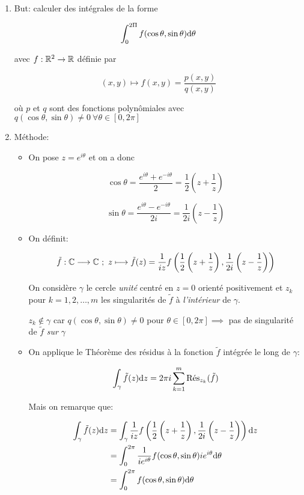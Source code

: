 \begin{enumerate}[label=\alph*)]
    \item But: calculer des intégrales de la forme
    
    \[ \int_0^{2\Pi} f(\cos \theta, \sin \theta) \dth \]
    
    avec $f: \R^2 \rightarrow \R$ définie par
    
    \[ (x,y) \longmapsto f(x,y) = \frac{p(x,y)}{q(x,y)} \]
    
    où $p$ et $q$ sont des fonctions polynômiales avec $q(\cos \theta, \sin \theta) \neq 0 \ \forall \theta \in [0, 2\pi]$
    
    \item Méthode:
    
    \begin{itemize}
    \item 
    On pose $z = e^{i\theta}$ et on a donc
    
    \[ \cos \theta = \frac{e^{i\theta} + e^{-i\theta}}{2}
    = \frac{1}{2} \left(z + \frac{1}{z}\right) \]
    
    \[ \sin \theta = \frac{e^{i\theta} - e^{-i\theta}}{2i}
    = \frac{1}{2i} \left(z - \frac{1}{z}\right) \]
    
    \item 
    On définit:
    
    \[ \tilde{f}: \Cx \longrightarrow \Cx \ ; \ z \longmapsto \tilde{f}(z) = \frac{1}{iz} f\left(\frac{1}{2} \left(z + \frac{1}{z}\right), \frac{1}{2i} \left(z - \frac{1}{z}\right)\right) \]
    
    On considère $\gamma$ le cercle \textit{unité} centré en $z = 0$ orienté positivement et $z_k$ pour $k = 1, 2, \ldots, m$ les singularités de $\tilde{f}$ à \textit{l'intérieur} de $\gamma$.
    
    $z_k \notin \gamma$ car $q(\cos \theta, \sin \theta) \neq 0$ pour $\theta \in [0, 2\pi] \implies$ pas de singularité de $\tilde{f}$ \textit{sur} $\gamma$
    
    \item 
    On applique le Théorème des résidus à la fonction $ \tilde{f}$ intégrée le long de $\gamma$:
    
    \[ \int_\gamma \tilde{f}(z) \dz = 2\pi i \sum_{k = 1}^m \Res_{z_k} (\tilde{f}) \]
    
    Mais on remarque que:
    
    \begin{align*}
    \int_\gamma \tilde{f}(z) \dz &= \int_\gamma \frac{1}{iz} f\left(\frac{1}{2} \left(z + \frac{1}{z}\right), \frac{1}{2i} \left(z - \frac{1}{z}\right)\right) \dz
    \\&= \int_0^{2\pi} \frac{1}{ie^{i\theta}} f(\cos \theta, \sin \theta) i e^{i\theta} \dth
    \\&= \int_0^{2\pi} f(\cos \theta, \sin \theta) \dth
    \end{align*}
    

\end{itemize}
\end{enumerate}
